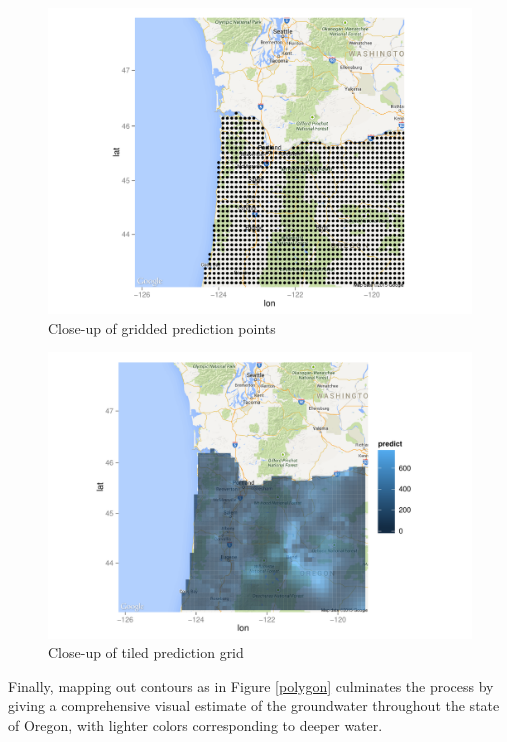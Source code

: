 \documentclass[12pt,twoside]{reedthesis}
\begin{document}
 
 \begin{figure}[h]
	   
	       \centering
	  
	    \includegraphics[scale=0.9]{points_zoom}
	
	     \caption{Close-up of gridded prediction points}
	 \label{grid}
	\end{figure}
 
\begin{figure}[h]
	   
	       \centering
	  
	    \includegraphics[scale=0.9]{tile_zoom}
	
	     \caption{Close-up of tiled prediction grid}
	 \label{tile}
	\end{figure}
	
Finally, mapping out contours as in Figure \ref{polygon} culminates the process by giving a comprehensive visual estimate of the groundwater throughout the state of Oregon, with lighter colors corresponding to deeper water.
	
\end{document}
